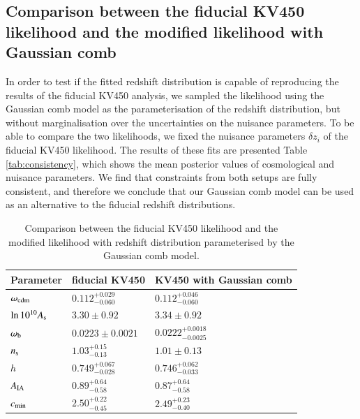\documentclass{aa}
\begin{document}
\begin{appendix}
\section{Comparison between the fiducial KV450 likelihood and the modified likelihood with Gaussian comb}
\label{ap:kv450_likelihood}
In order to test if the fitted redshift distribution is capable of reproducing the results of the fiducial KV450 analysis, we sampled the likelihood using the Gaussian comb model as the parameterisation of the redshift distribution, but without marginalisation over the uncertainties on the nuisance parameters. To be able to compare the two likelihoods, we fixed the nuisance parameters $\delta z_i$ of the fiducial KV450 likelihood. The results of these fits are presented Table \ref{tab:consistency}, which shows the mean posterior values of cosmological and nuisance parameters. We find that constraints from both setups are fully consistent, and therefore we conclude that our Gaussian comb model can be used as an alternative to the fiducial redshift distributions.

\begin{table}
\caption{Comparison between the fiducial KV450 likelihood and the modified likelihood with redshift distribution parameterised by the Gaussian comb model.}
\centering
\begin{tabular}{lll}
\hline\hline
Parameter & fiducial KV450 & KV450 with Gaussian comb\\
\hline
$\omega_{\rm cdm }  $ & $0.112^{+0.029}_{-0.060}   $& $0.112^{+0.046}_{-0.060}   $\\

$\ln10^{10}A_{\rm s}$ & $3.30\pm 0.92              $& $3.34\pm 0.92              $\\

$\omega_{\rm b}    $ & $0.0223\pm 0.0021          $& $0.0222^{+0.0018}_{-0.0025}$\\

$n_{\rm s}         $ & $1.03^{+0.15}_{-0.13}      $& $1.01\pm 0.13              $\\

$h              $ & $0.749^{+0.067}_{-0.028}   $& $0.746^{+0.062}_{-0.033}   $\\
\hline
$A_{\rm IA}        $ & $0.89^{+0.64}_{-0.58}      $& $0.87^{+0.64}_{-0.58}              $\\

$c_{\rm min}       $ & $2.50^{+0.22}_{-0.45}      $& $2.49^{+0.23}_{-0.40}     $\\


\end{tabular}
\end{table}
\end{appendix}
\end{document}
